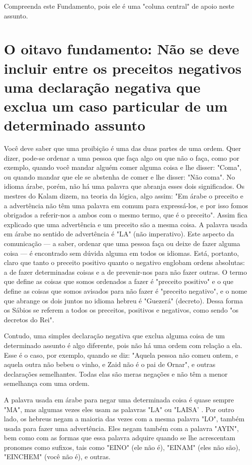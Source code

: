 \begin{itemize}
\begin{enumrate}
Compreenda este Fundamento, pois ele é uma "coluna central" de apoio
neste assunto.

\chapter{O oitavo fundamento: Não se deve incluir entre os preceitos negativos uma declaração negativa que exclua um caso particular de um determinado assunto}

Você deve saber que uma proibição é uma das duas partes de uma ordem.
Quer dizer, pode-se ordenar a uma pessoa que faça algo ou que não o
faça, como por exemplo, quando você mandar alguém comer alguma coisa e
lhe disser: "Coma", ou quando mandar que ele se abstenha de comer e lhe
disser: "Não coma". No idioma árabe, porém, não há uma palavra que
abranja esses dois significados. Os mestres do Kalam dizem, na teoria da
lógica, algo assim: "Em árabe o preceito e a advertência não têm uma
palavra em comum para expressá-los, e por isso fomos obrigados a
referir-nos a ambos com o mes­mo termo, que é o preceito". Assim fica
explicado que uma advertência e um preceito são a mesma coisa. A palavra
usada em árabe no sentido de advertên­cia é "LA" (não imperativo). Este
aspecto da comunicação --- a saber, ordenar que uma pessoa faça ou deixe
de fazer alguma coisa --- é encontrado sem dúvi­da alguma em todos os
idiomas. Está, portanto, claro que tanto o preceito posi­tivo quanto o
negativo englobam ordens absolutas: a de fazer determinadas coi­sas e a
de prevenir-nos para não fazer outras. O termo que define as coisas que
somos ordenados a fazer é "preceito positivo" e o que define as coisas
que so­mos avisados para não fazer é "preceito negativo", e o nome que
abrange os dois juntos no idioma hebreu é "Guezerá" (decreto). Dessa
forma os Sábios se referem a todos os preceitos, positivos e negativos,
como sendo "os decre­tos do Rei".

Contudo, uma simples declaração negativa que exclua alguma coisa de um
determinado assunto é algo diferente, pois não há uma ordem com rela­ção
a ela. Esse é o caso, por exemplo, quando se diz: "Aquela pessoa não
co­meu ontem, e aquela outra não bebeu o vinho, e Zaid não é o pai de
Ornar", e outras declarações semelhantes. Todas elas são meras negações
e não têm a menor semelhança com uma ordem.

A palavra usada em árabe para negar uma determinada coisa é quase sempre
"MA", mas algumas vezes eles usam as palavras "LA" ou "LAISA' . Por
outro lado, os hebreus negam a maioria das vezes com a mesma palavra
"LO", também usada para fazer uma advertência. Eles negam também com a
palavra "AYIN", bem como com as formas que essa palavra adquire quando
se lhe acres­centam pronomes como sufixos, tais como "EINO" (ele não é),
"EINAM" (eles não são), "EINCHEM" (você não é), e outras.


\end{enumrate}
\end{itemize}
